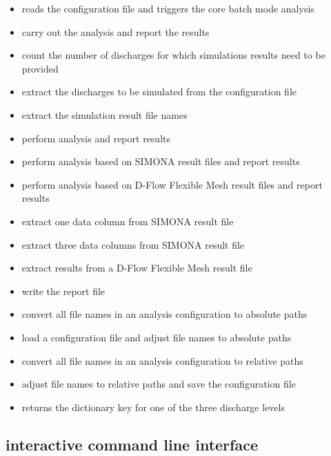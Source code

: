 \begin{itemize}
\item {} reads the configuration file and triggers the core batch mode analysis
\item {} carry out the analysis and report the results
\item {} count the number of discharges for which simulations results need to be provided
\item {} extract the discharges to be simulated from the configuration file
\item {} extract the simulation result file names
\item {} perform analysis and report results
\item {} perform analysis based on SIMONA result files and report results
\item {} perform analysis based on D-Flow Flexible Mesh result files and report results
\item {} extract one data column from SIMONA result file
\item {} extract three data columns from SIMONA result file
\item {} extract results from a D-Flow Flexible Mesh result file
\item {} write the report file
\item {} convert all file names in an analysis configuration to absolute paths
\item {} load a configuration file and adjust file names to absolute paths
\item {} convert all file names in an analysis configuration to relative paths
\item {} adjust file names to relative paths and save the configuration file
\item {} returns the dictionary key for one of the three discharge levels
\end{itemize}

\subsection{interactive command line interface }

